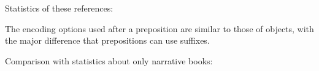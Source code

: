 \documentclass{report}
\begin{document}
Statistics of these references:

\noindent
\begin{minipage}{.5\textwidth}

\end{minipage}
\begin{minipage}{.5\textwidth}
\centering

\end{minipage}

The encoding options used after a preposition are similar to those of objects, with the major difference that prepositions can use suffixes.

Comparison with statistics about only narrative books:\\
\noindent
\begin{minipage}{.5\textwidth}

\end{minipage}
\begin{minipage}{.5\textwidth}
\centering

\end{minipage}
\end{document}
